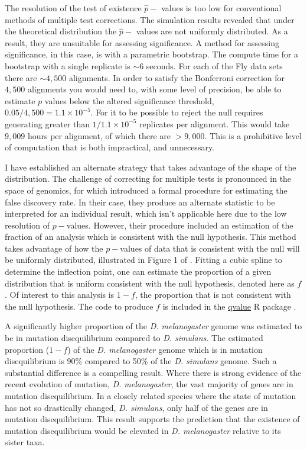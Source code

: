 The resolution of the test of existence $\hat p-$ values is too low for conventional methods of multiple test corrections. The simulation results revealed that under the theoretical distribution the $\hat p-$ values are not uniformly distributed. As a result, they are unsuitable for assessing significance. A method for assessing significance, in this case, is with a parametric bootstrap. The compute time for a bootstrap with a single replicate is ${\sim} 6$ seconds. For each of the Fly data sets there are ${\sim} 4,500$ alignments. In order to satisfy the Bonferroni correction for $4,500$ alignments you would need to, with some level of precision, be able to estimate $p$ values below the altered significance threshold, $0.05/4,500 = 1.1{\times}10^{-5}$. For it to be possible to reject the null requires generating greater than $1/1.1{\times}10^{-5}$ replicates per alignment. This would take $9,009$ hours per alignment, of which there are $>9,000$. This is a prohibitive level of computation that is both impractical, and unnecessary. 

I have established an alternate strategy that takes advantage of the shape of the distribution. The challenge of correcting for multiple tests is pronounced in the space of genomics, for which \cite{Storey2003StatisticalStudies} introduced a formal procedure for estimating the false discovery rate. In their case, they produce an alternate statistic to be interpreted for an individual result, which isn't applicable here due to the low resolution of $p-$values. However, their procedure included an estimation of the fraction of an analysis which is consistent with the null hypothesis. This method takes advantage of how the $p-$values of data that is consistent with the null will be uniformly distributed, illustrated in Figure 1 of \citep{Storey2003StatisticalStudies}. Fitting a cubic spline to determine the inflection point, one can estimate the proportion of a given distribution that is uniform consistent with the null hypothesis, denoted here as $f$. Of interest to this analysis is $1 - f$, the proportion that is not consistent with the null hypothesis. The code to produce $f$ is included in the \href{https://github.com/StoreyLab/qvalue}{qvalue} R package \citep{Storey2004StrongApproach}.

A significantly higher proportion of the \textit{D. melanogaster} genome was estimated to be in mutation disequilibrium compared to \textit{D. simulans}. The estimated proportion ($1 - f$) of the \textit{D. melanogaster} genome which is in mutation disequilibrium is 90\% compared to 50\% of the \textit{D. simulans} genome. Such a substantial difference is a compelling result. Where there is strong evidence of the recent evolution of mutation, \textit{D. melanogaster}, the vast majority of genes are in mutation disequilibrium. In a closely related species where the state of mutation has not so drastically changed, \textit{D. simulans}, only half of the genes are in mutation disequilibrium. This result supports the prediction that the existence of mutation disequilibrium would be elevated in \textit{D. melanogaster} relative to its sister taxa.

